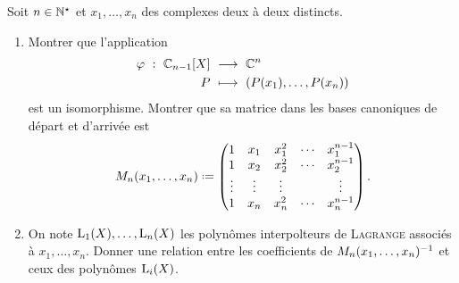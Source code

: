\begin{exercice}
    Soit $n \in \mathbb{N}^\star$ et $x_1, \dots, x_n$ des complexes deux à deux distincts.
    \begin{enumerate}
        \item Montrer que l'application
        \begin{alignat*}{2}
            \varphi\ :\ \mathbb{C}_{n-1}[X]\ &\longrightarrow\ \mathbb{C}^n\\
            P\ &\longmapsto\ \left( P(x_1), \dots, P(x_n) \right)
        \end{alignat*}
        est un isomorphisme. Montrer que sa matrice dans les bases canoniques de départ et d'arrivée est 
        $$
        M_n(x_1, \dots, x_n) \defeq
        \begin{pmatrix}
            1 & x_1 & x_1^2 & \cdots & x_1^{n-1} \\
            1 & x_2 & x_2^2 & \cdots & x_2^{n-1} \\
            \vdots & \vdots & \vdots & & \vdots \\
            1 & x_n & x_n^2 & \cdots & x_n^{n-1}
        \end{pmatrix}.
        $$
        \item On note $\mathrm{L}_1(X), \dots, \mathrm{L}_n(X)$ les polynômes interpolteurs de \textsc{Lagrange} associés à $x_1, \dots, x_n$. Donner une relation entre les coefficients de $M_n(x_1, \dots, x_n)^{-1}$ et ceux des polynômes $\mathrm{L}_i(X)$.
    \end{enumerate}
\end{exercice}